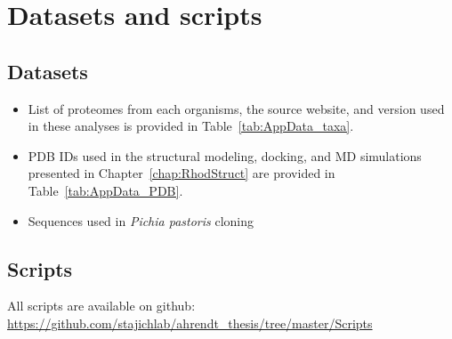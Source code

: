\chapter{Datasets and scripts}
\label{app:Data}
\section*{Datasets}
\begin{itemize}
  \item List of proteomes from each organisms, the source website, and version used in these analyses is provided in Table~\ref{tab:AppData_taxa}.\\
  \item PDB IDs used in the structural modeling, docking, and MD simulations presented in Chapter~\ref{chap:RhodStruct} are provided in Table~\ref{tab:AppData_PDB}.\\
  \item Sequences used in \textit{Pichia pastoris} cloning \\
\end{itemize}
\section*{Scripts}
All scripts are available on github: \url{https://github.com/stajichlab/ahrendt_thesis/tree/master/Scripts}
